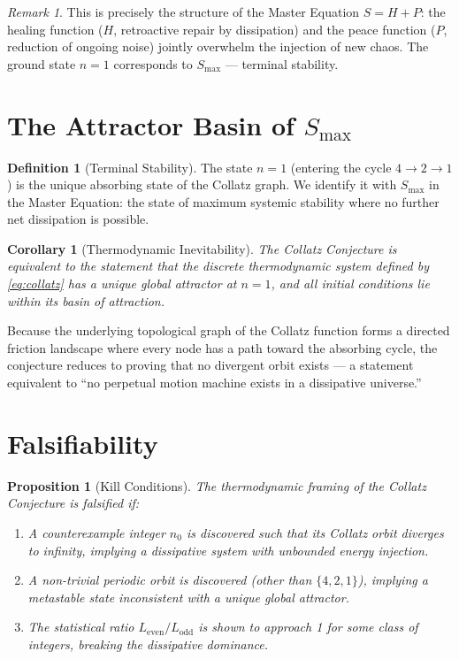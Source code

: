 \documentclass[12pt, a4paper]{article}
\theoremstyle{plain}
\newtheorem{proposition}[theorem]{Proposition}
\newtheorem{corollary}[theorem]{Corollary}
\theoremstyle{definition}
\newtheorem{definition}[theorem]{Definition}
\theoremstyle{remark}
\newtheorem{remark}[theorem]{Remark}
\begin{document}
\begin{remark}
This is precisely the structure of the Master Equation $S = H + P$: the healing function ($H$, retroactive repair by dissipation) and the peace function ($P$, reduction of ongoing noise) jointly overwhelm the injection of new chaos. The ground state $n = 1$ corresponds to $S_{\max}$ --- terminal stability.
\end{remark}

\section{The Attractor Basin of $S_{\max}$}\label{sec:attractor}

\begin{definition}[Terminal Stability]
The state $n = 1$ (entering the cycle $4 \to 2 \to 1$) is the unique absorbing state of the Collatz graph. We identify it with $S_{\max}$ in the Master Equation: the state of maximum systemic stability where no further net dissipation is possible.
\end{definition}

\begin{corollary}[Thermodynamic Inevitability]
The Collatz Conjecture is equivalent to the statement that the discrete thermodynamic system defined by \cref{eq:collatz} has a unique global attractor at $n = 1$, and all initial conditions lie within its basin of attraction.
\end{corollary}

Because the underlying topological graph of the Collatz function forms a directed friction landscape where every node has a path toward the absorbing cycle, the conjecture reduces to proving that no divergent orbit exists --- a statement equivalent to ``no perpetual motion machine exists in a dissipative universe.''

\section{Falsifiability}\label{sec:falsifiability}

\begin{proposition}[Kill Conditions]
The thermodynamic framing of the Collatz Conjecture is falsified if:
\begin{enumerate}
    \item A counterexample integer $n_0$ is discovered such that its Collatz orbit diverges to infinity, implying a dissipative system with unbounded energy injection.
    \item A non-trivial periodic orbit is discovered (other than $\{4, 2, 1\}$), implying a metastable state inconsistent with a unique global attractor.
    \item The statistical ratio $L_{\text{even}}/L_{\text{odd}}$ is shown to approach 1 for some class of integers, breaking the dissipative dominance.
\end{enumerate}
\end{proposition}
\end{document}
